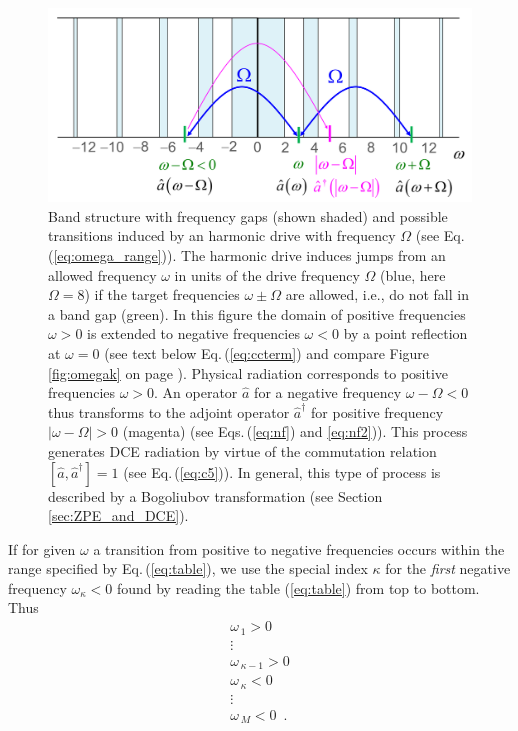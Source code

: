\begin{figure}
    \includegraphics[width=1.0\textwidth, keepaspectratio]{figures/system/jump.png}
    \caption{Band structure with frequency gaps (shown shaded) and possible transitions induced by an harmonic drive with 
    frequency $\Omega$ (see Eq.\,(\ref{eq:omega_range})). 
    The harmonic drive induces jumps from an allowed frequency $\omega$ in units of the drive frequency $\Omega$ (blue, 
    here $\Omega=8$)
    if the target frequencies $\omega \pm \Omega$ are allowed, i.e., do not fall in a band gap (green). 
    In this figure the domain of positive frequencies $\omega>0$
    is extended to negative frequencies $\omega<0$ by a point reflection at $\omega=0$
    (see text below Eq.\,(\ref{eq:ccterm}) and compare Figure\,\ref{fig:omegak} on page \pageref{fig:omegak}). 
    Physical radiation corresponds to positive frequencies $\omega > 0$. An operator $\hat{a}$ for a 
    negative frequency $\omega - \Omega < 0$ thus transforms to the adjoint operator $\hat{a}^{\dagger}$ 
    for positive frequency $|\omega - \Omega| > 0$ (magenta) (see Eqs.\,(\ref{eq:nf}) and \ref{eq:nf2})). 
    This process generates DCE radiation by virtue of the commutation relation 
    $\left[ \hat{a}, \hat{a}^{\dagger} \right] = 1$ (see Eq.\,(\ref{eq:c5})).  
    In general, this type of process is described by a Bogoliubov transformation 
    (see Section \ref{sec:ZPE_and_DCE}).} 
    \label{fig:jump}
\end{figure}

If for given $\omega$ a transition from positive to negative frequencies
occurs within the range specified by Eq.\,(\ref{eq:table}),
we use the special index $\kappa$ for the {\em first} negative frequency 
$\omega_{\kappa}<0$ found by reading the table (\ref{eq:table}) from top to bottom. 
Thus
%
\begin{equation} \label{eq:table_kappa}
\begin{array}{l}
\omega_{\,1} > 0 \\
\vdots \\
\omega_{\,\kappa-1} > 0 \\
\omega_{\,\kappa} < 0 \\
\vdots \\
\omega_{\,M} < 0 \, \, \, .
\end{array}
\end{equation}

